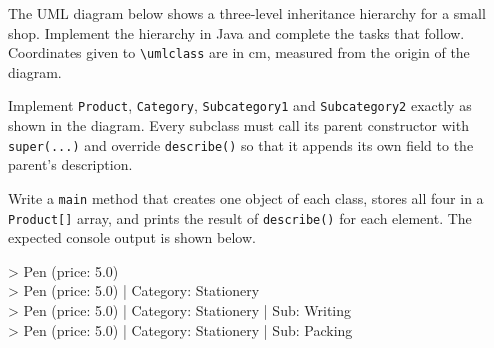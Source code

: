 
\noindent The UML diagram below shows a three-level inheritance hierarchy
for a small shop. Implement the hierarchy in Java and complete the tasks
that follow. Coordinates given to \texttt{\textbackslash umlclass} are in
cm, measured from the origin of the diagram.

\begin{center}
\end{center}

Implement \texttt{Product}, \texttt{Category}, \texttt{Subcategory1} and
\texttt{Subcategory2} exactly as shown in the diagram. Every subclass must
call its parent constructor with \texttt{super(...)} and override
\texttt{describe()} so that it appends its own field to the parent's
description.

Write a \texttt{main} method that creates one object of each class, stores
all four in a \texttt{Product[]} array, and prints the result of
\texttt{describe()} for each element. The expected console output is shown
below.

\begin{expectedoutput}
> Pen (price: 5.0)\\
> Pen (price: 5.0) | Category: Stationery\\
> Pen (price: 5.0) | Category: Stationery | Sub: Writing\\
> Pen (price: 5.0) | Category: Stationery | Sub: Packing
\end{expectedoutput}
